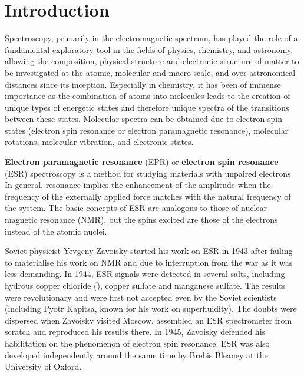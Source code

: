 \documentclass[%
 reprint,
nofootinbib,
 amsmath,amssymb,
 aps,
floatfix,
]{revtex4-2}
\begin{document}
\section{\label{sec:level1}Introduction}
    Spectroscopy, primarily in the electromagnetic spectrum, has played the role of a fundamental exploratory tool in the fields of physics, chemistry, and astronomy, allowing the composition, physical structure and electronic structure of matter to be investigated at the atomic, molecular and macro scale, and over astronomical distances since its inception. Especially in chemistry, it has been of immense importance as the combination of atoms into molecules leads to the creation of unique types of energetic states and therefore unique spectra of the transitions between these states. Molecular spectra can be obtained due to electron spin states (electron spin resonance or electron paramagnetic resonance), molecular rotations, molecular vibration, and electronic states.
    \par
    \textbf{Electron paramagnetic resonance} (EPR) or \textbf{electron spin resonance} (ESR) spectroscopy is a method for studying materials with unpaired electrons. In general, resonance implies the enhancement of the amplitude when the frequency of the externally applied force matches with the natural frequency of the system. The basic concepts of ESR are analogous to those of nuclear magnetic resonance (NMR), but the spins excited are those of the electrons instead of the atomic nuclei.
    \par
    Soviet physicist Yevgeny Zavoisky started his work on ESR in 1943 after failing to materialise his work on NMR and due to interruption from the war as it was less demanding. In 1944, ESR signals were detected in several salts, including hydrous copper chloride (), copper sulfate and manganese sulfate. The results were revolutionary and were first not accepted even by the Soviet scientists (including Pyotr Kapitsa, known for his work on superfluidity). The doubts were dispersed when Zavoisky visited Moscow, assembled an ESR spectrometer from scratch and reproduced his results there. In 1945, Zavoisky defended his habilitation on the phenomenon of electron spin resonance. ESR was also developed independently around the same time by Brebis Bleaney at the University of Oxford.
\end{document}
